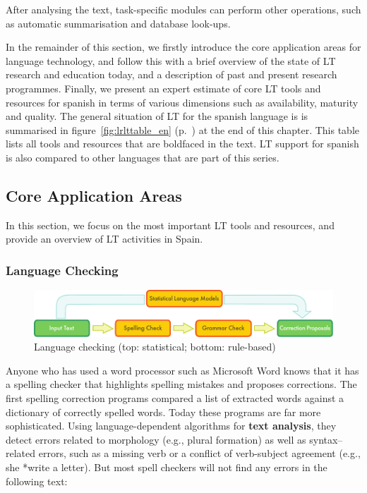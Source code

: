 \begin{multicols}{2}
After analysing the text, task-specific modules can perform other operations, such as automatic summarisation and database look-ups.

In the remainder of this section, we firstly introduce the core application areas for language technology, and follow this with a brief overview of the state of LT research and education today, and a description of past and present research programmes. Finally, we present an expert estimate of core LT tools and resources for spanish in terms of various dimensions such as availability, maturity and quality. The general situation of LT for the spanish language is is summarised in figure~\ref{fig:lrlttable_en} (p.~\pageref{fig:lrlttable_en}) at the end of this chapter. This table lists all tools and resources that are boldfaced in the text. LT support for spanish is also compared to other languages that are part of this series.

\subsection{Core Application Areas}

In this section, we focus on the most important LT tools and resources, and provide an overview of LT activities in Spain.

\subsubsection{Language Checking}

\begin{figure}[t]
  \center
  \includegraphics[width=\textwidth]{../_media/english/language_checking}
  \caption{Language checking (top: statistical; bottom: rule-based)}
  \label{fig:langcheckingaarch_en}
\end{figure}

Anyone who has used a word processor such as Microsoft Word knows that it has a spelling checker that highlights spelling mistakes and proposes corrections. The first spelling correction programs compared a list of extracted words against a dictionary of correctly spelled words. Today these programs are far more sophisticated. Using language-dependent algorithms for \textbf{text analysis}, they detect errors related to morphology (e.g., plural formation) as well as syntax--related errors, such as a missing verb or a conflict of verb-subject agreement (e.g., she *write a letter). But most spell checkers will not find any errors in the following text:


\end{multicols}
